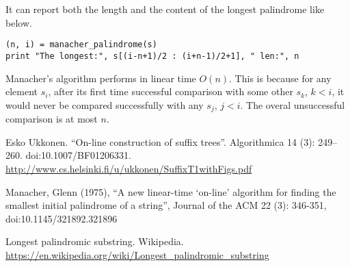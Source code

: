\documentclass[b5paper]{article}
\begin{document}
It can report both the length and the content of the longest palindrome like below.

\lstset{language=Python}
\begin{lstlisting}
(n, i) = manacher_palindrome(s)
print "The longest:", s[(i-n+1)/2 : (i+n-1)/2+1], " len:", n
\end{lstlisting}

Manacher's algorithm performs in linear time $O(n)$. This is because for any element $s_i$,
after its first time successful comparison with some other $s_k$, $k < i$, it would never be compared
successfully with any $s_j$, $j < i$. The overal unsuccessful comparison is at most $n$.

\begin{thebibliography}{99}

Esko Ukkonen. ``On-line construction of suffix trees''. Algorithmica 14 (3): 249--260. doi:10.1007/BF01206331. \url{http://www.cs.helsinki.fi/u/ukkonen/SuffixT1withFigs.pdf}

Manacher, Glenn (1975), ``A new linear-time `on-line' algorithm for finding the smallest initial palindrome of a string'', Journal of the ACM 22 (3): 346-351, doi:10.1145/321892.321896

Longest palindromic substring. Wikipedia. \url{https://en.wikipedia.org/wiki/Longest_palindromic_substring}

\end{thebibliography}
\end{document}
